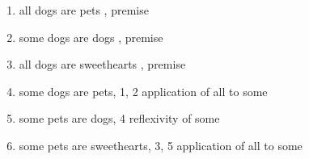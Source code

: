 \documentclass{article}
\begin{document}
	\begin{enumerate}\item all dogs are pets , premise
\item some dogs are dogs , premise
\item all dogs are sweethearts , premise
\item some dogs are pets, 1, 2 application of all to some\item some pets are dogs, 4 reflexivity of some\item some pets are sweethearts, 3, 5 application of all to some

\end{enumerate}
\end{document}
